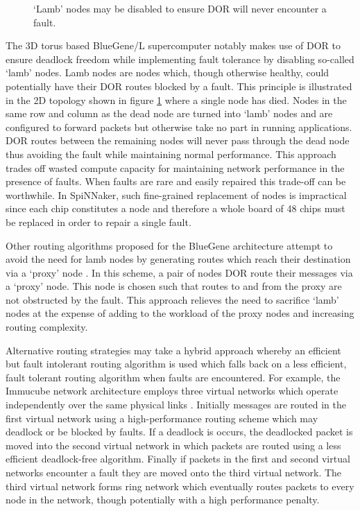 			\begin{figure}
				\center
				
				\caption{`Lamb' nodes may be disabled to ensure DOR will never
				encounter a fault.}
				\label{fig:lamb-nodes}
			\end{figure}
			
			The 3D torus based BlueGene/L supercomputer \cite{adiga02} notably makes
			use of DOR to ensure deadlock freedom while implementing fault tolerance
			by disabling so-called `lamb' nodes. Lamb nodes are nodes which, though
			otherwise healthy, could potentially have their DOR routes blocked by a
			fault. This principle is illustrated in the 2D topology shown in figure
			\ref{fig:lamb-nodes} where a single node has died. Nodes in the same row
			and column as the dead node are turned into `lamb' nodes and are
			configured to forward packets but otherwise take no part in running
			applications. DOR routes between the remaining nodes will never pass
			through the dead node thus avoiding the fault while maintaining normal
			performance. This approach trades off wasted compute capacity for
			maintaining network performance in the presence of faults. When faults
			are rare and easily repaired this trade-off can be worthwhile. In
			SpiNNaker, such fine-grained replacement of nodes is impractical since
			each chip constitutes a node and therefore a whole board of 48 chips must
			be replaced in order to repair a single fault.
			
			Other routing algorithms proposed for the BlueGene architecture attempt
			to avoid the need for lamb nodes by generating routes which reach their
			destination via a `proxy' node \cite{gomez04}. In this scheme, a pair of
			nodes DOR route their messages via a `proxy' node.  This node is chosen
			such that routes to and from the proxy are not obstructed by the fault.
			This approach relieves the need to sacrifice `lamb' nodes at the expense
			of adding to the workload of the proxy nodes and increasing routing
			complexity.
			
			Alternative routing strategies may take a hybrid approach whereby an
			efficient but fault intolerant routing algorithm is used which falls back
			on a less efficient, fault tolerant routing algorithm when faults are
			encountered. For example, the Immucube network architecture employs three
			virtual networks which operate independently over the same physical links
			\cite{puente07}. Initially messages are routed in the first virtual
			network using a high-performance routing scheme which may deadlock or be
			blocked by faults.  If a deadlock is occurs, the deadlocked packet is
			moved into the second virtual network in which packets are routed using a
			less efficient deadlock-free algorithm. Finally if packets in the first
			and second virtual networks encounter a fault they are moved onto the
			third virtual network. The third virtual network forms ring network which
			eventually routes packets to every node in the network, though
			potentially with a high performance penalty.
			
